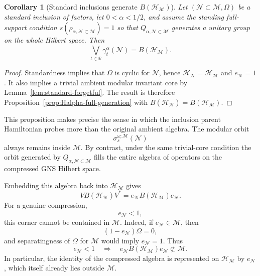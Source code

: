 \documentclass[a4paper,11pt]{article}
\newtheorem{corollary}[theorem]{Corollary}
\theoremstyle{definition}
\newcommand{\mN}{\mathcal{N}}
\newcommand{\mH}{\mathcal{H}}
\newcommand{\mM}{\mathcal{M}}
\begin{document}
\begin{corollary}[Standard inclusions generate $B(\mH_{\mM})$]
\label{cor:standard-Halpha-full-generation}
Let $(\mN\subset\mM,\Omega)$ be a standard inclusion of factors,
let $0<\alpha<1/2$, and assume the standing full-support condition
$s(\rho_{\alpha,\mN\subset\mM})=1$ so that $Q_{\alpha,\mN\subset\mM}$ generates a
unitary group on the whole Hilbert space. Then
\begin{equation}
    \boxed{
    \bigvee_{t\in\mathbb R}
    \gamma_t^\alpha(\mN)
    =B(\mH_{\mM}).
    }
    \label{eq:standard-Halpha-full-BHM}
\end{equation}
\end{corollary}
\begin{proof}
Standardness implies that $\Omega$ is cyclic for $\mN$, hence
$\mH_{\mN}=\mH_{\mM}$ and $e_{\mN}=1$. It also implies a trivial ambient modular invariant core by Lemma~\ref{lem:standard-forgetful}. The result is therefore
Proposition~\ref{prop:Halpha-full-generation} with
$B(\mH_{\mN})=B(\mH_{\mM})$.
\end{proof}

This proposition makes precise the sense in which the inclusion parent Hamiltonian
probes more than the original ambient algebra. The modular orbit
\begin{equation}
    \sigma_s^{\omega;\mM}(\mN)
\end{equation}
always remains inside $\mM$. By contrast, under the same
trivial-core condition the orbit generated by $Q_{\alpha,\mN\subset\mM}$
fills the entire algebra of operators on the compressed GNS Hilbert space.

Embedding this algebra back into $\mH_{\mM}$ gives
\begin{equation}
    V B(\mH_{\mN})V^*
    =
    e_{\mN}B(\mH_{\mM})e_{\mN} .
    \label{eq:corner-BHN}
\end{equation}
For a genuine compression,
\begin{equation}
    e_{\mN}<1,
\end{equation}
this corner cannot be contained in $\mM$. Indeed, if
$e_{\mN}\in\mM$, then
\begin{equation}
    (1-e_{\mN})\Omega=0,
\end{equation}
and separatingness of $\Omega$ for $\mM$ would imply
$e_{\mN}=1$. Thus
\begin{equation}
    \boxed{
    e_{\mN}<1
    \quad\Longrightarrow\quad
    e_{\mN}B(\mH_{\mM})e_{\mN}
    \not\subset\mM.
    }
    \label{eq:corner-outside-M}
\end{equation}
In particular, the identity of the compressed algebra is represented on
$\mH_{\mM}$ by $e_{\mN}$, which itself already lies outside $\mM$.
\end{document}
